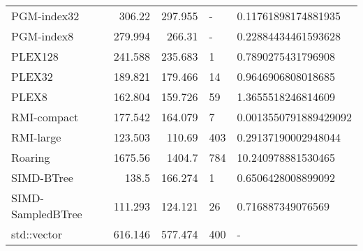 \begin{tabular}{lrrll}
 PGM-index32       &                306.22  &               297.955 & -            & 0.11761898174881935   \\
 PGM-index8        &                279.994 &               266.31  & -            & 0.22884434461593628   \\
 PLEX128           &                241.588 &               235.683 & 1            & 0.7890275431796908    \\
 PLEX32            &                189.821 &               179.466 & 14           & 0.9646906808018685    \\
 PLEX8             &                162.804 &               159.726 & 59           & 1.3655518246814609    \\
 RMI-compact       &                177.542 &               164.079 & 7            & 0.0013550791889429092 \\
 RMI-large         &                123.503 &               110.69  & 403          & 0.29137190002948044   \\
 Roaring           &               1675.56  &              1404.7   & 784          & 10.240978881530465    \\
 SIMD-BTree        &                138.5   &               166.274 & 1            & 0.6506428008899092    \\
 SIMD-SampledBTree &                111.293 &               124.121 & 26           & 0.716887349076569     \\
 std::vector       &                616.146 &               577.474 & 400          & -                     \\
\hline
\end{tabular}